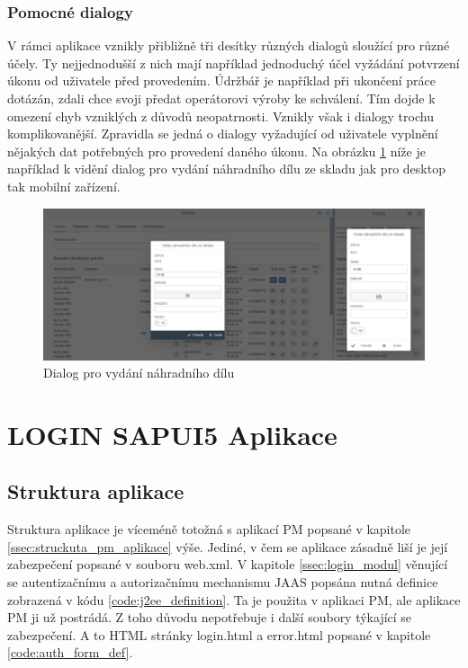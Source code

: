 \documentclass[thesis=M,czech]{FITthesis}[2012/06/26]
\begin{document}
\subsubsection{Pomocné dialogy}
V rámci aplikace vznikly přibližně tři desítky různých dialogů sloužící pro různé účely. Ty nejjednodušší z nich mají například jednoduchý účel vyžádání potvrzení úkonu od uživatele před provedením. Údržbář je například při ukončení práce dotázán, zdali chce svoji předat operátorovi výroby ke schválení. Tím dojde k omezení chyb vzniklých z důvodů neopatrnosti. Vznikly však i dialogy trochu komplikovanější. Zpravidla se jedná o dialogy vyžadující od uživatele vyplnění nějakých dat potřebných pro provedení daného úkonu. Na obrázku \ref{img:view_dialog} níže je například k vidění dialog pro vydání náhradního dílu ze skladu jak pro desktop tak mobilní zařízení. 
\begin{figure}[H]
	\centering
	\includegraphics[width=1\textwidth]{images/view_dialog}
	\caption{Dialog pro vydání náhradního dílu}
	\label{img:view_dialog}
\end{figure}	

\section{LOGIN SAPUI5 Aplikace}
\subsection{Struktura aplikace}
Struktura aplikace je víceméně totožná s aplikací PM popsané v kapitole \ref{ssec:struckuta_pm_aplikace} výše. Jediné, v čem se aplikace zásadně liší je její zabezpečení popsané v souboru web.xml. V kapitole \ref{ssec:login_modul} věnující se autentizačnímu a autorizačnímu mechanismu JAAS popsána nutná definice zobrazená v kódu \ref{code:j2ee_definition}. Ta je použita v aplikaci PM, ale aplikace PM ji už postrádá. Z toho důvodu nepotřebuje i další soubory týkající se zabezpečení. A to HTML stránky login.html a error.html popsané v kapitole \ref{code:auth_form_def}.
\end{document}
